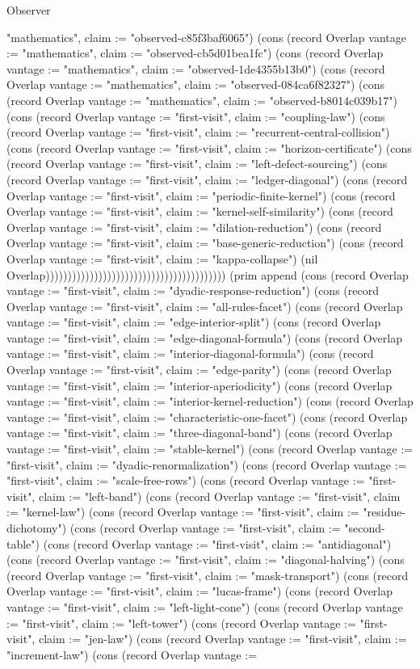 \begin{lexlean}{Observer}
\begin{semanticmodule}
{"mathematics", claim := "observed-c85f3baf6065"}) (cons (record Overlap {vantage := "mathematics", claim := "observed-cb5d01bea1fc"}) (cons (record Overlap {vantage := "mathematics", claim := "observed-1de4355b13b0"}) (cons (record Overlap {vantage := "mathematics", claim := "observed-084ca6f82327"}) (cons (record Overlap {vantage := "mathematics", claim := "observed-b8014c039b17"}) (cons (record Overlap {vantage := "first-visit", claim := "coupling-law"}) (cons (record Overlap {vantage := "first-visit", claim := "recurrent-central-collision"}) (cons (record Overlap {vantage := "first-visit", claim := "horizon-certificate"}) (cons (record Overlap {vantage := "first-visit", claim := "left-defect-sourcing"}) (cons (record Overlap {vantage := "first-visit", claim := "ledger-diagonal"}) (cons (record Overlap {vantage := "first-visit", claim := "periodic-finite-kernel"}) (cons (record Overlap {vantage := "first-visit", claim := "kernel-self-similarity"}) (cons (record Overlap {vantage := "first-visit", claim := "dilation-reduction"}) (cons (record Overlap {vantage := "first-visit", claim := "base-generic-reduction"}) (cons (record Overlap {vantage := "first-visit", claim := "kappa-collapse"}) (nil Overlap))))))))))))))))))))))))))))))))))))))))) (prim append (cons (record Overlap {vantage := "first-visit", claim := "dyadic-response-reduction"}) (cons (record Overlap {vantage := "first-visit", claim := "all-rules-facet"}) (cons (record Overlap {vantage := "first-visit", claim := "edge-interior-split"}) (cons (record Overlap {vantage := "first-visit", claim := "edge-diagonal-formula"}) (cons (record Overlap {vantage := "first-visit", claim := "interior-diagonal-formula"}) (cons (record Overlap {vantage := "first-visit", claim := "edge-parity"}) (cons (record Overlap {vantage := "first-visit", claim := "interior-aperiodicity"}) (cons (record Overlap {vantage := "first-visit", claim := "interior-kernel-reduction"}) (cons (record Overlap {vantage := "first-visit", claim := "characteristic-one-facet"}) (cons (record Overlap {vantage := "first-visit", claim := "three-diagonal-band"}) (cons (record Overlap {vantage := "first-visit", claim := "stable-kernel"}) (cons (record Overlap {vantage := "first-visit", claim := "dyadic-renormalization"}) (cons (record Overlap {vantage := "first-visit", claim := "scale-free-rows"}) (cons (record Overlap {vantage := "first-visit", claim := "left-band"}) (cons (record Overlap {vantage := "first-visit", claim := "kernel-law"}) (cons (record Overlap {vantage := "first-visit", claim := "residue-dichotomy"}) (cons (record Overlap {vantage := "first-visit", claim := "second-table"}) (cons (record Overlap {vantage := "first-visit", claim := "antidiagonal"}) (cons (record Overlap {vantage := "first-visit", claim := "diagonal-halving"}) (cons (record Overlap {vantage := "first-visit", claim := "mask-transport"}) (cons (record Overlap {vantage := "first-visit", claim := "lucas-frame"}) (cons (record Overlap {vantage := "first-visit", claim := "left-light-cone"}) (cons (record Overlap {vantage := "first-visit", claim := "left-tower"}) (cons (record Overlap {vantage := "first-visit", claim := "jen-law"}) (cons (record Overlap {vantage := "first-visit", claim := "increment-law"}) (cons (record Overlap {vantage := }
\end{semanticmodule}
\end{lexlean}
